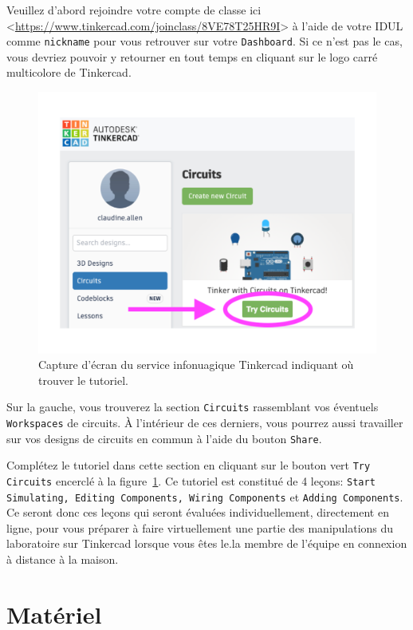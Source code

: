 \documentclass[canadien,12pt,oneside,letterpaper]{article}
\begin{document}
%
Veuillez d'abord rejoindre votre compte de classe ici <\url{https://www.tinkercad.com/joinclass/8VE78T25HR9I}> à l'aide de votre IDUL comme \texttt{nickname} pour vous retrouver sur votre \texttt{Dashboard}. Si ce n'est pas le cas, vous devriez pouvoir y retourner en tout temps en cliquant sur le logo carré multicolore de Tinkercad.
%
\begin{figure}[h]
    \centering
    \includegraphics[width=.5\linewidth]{Tutoriel_Circuits_TinkerCad.pdf}
    \caption{Capture d'écran du service infonuagique Tinkercad indiquant où trouver le tutoriel.}
    \label{fig:tinkercad-trycircuits}
\end{figure}
%
Sur la gauche, vous trouverez la section \texttt{Circuits} rassemblant vos éventuels \texttt{Workspaces} de circuits. À l'intérieur de ces derniers, vous pourrez aussi travailler sur vos designs de circuits en commun à l'aide du bouton \texttt{Share}.

Complétez le tutoriel dans cette section en cliquant sur le bouton vert \texttt{Try Circuits} encerclé à la figure~\ref{fig:tinkercad-trycircuits}. Ce tutoriel est constitué de 4 leçons: \texttt{Start Simulating, Editing Components, Wiring Components} et \texttt{Adding Components}. Ce seront donc ces leçons qui seront évaluées individuellement, directement en ligne, pour vous préparer à faire virtuellement une partie des manipulations du laboratoire sur Tinkercad lorsque vous êtes le.la membre de l'équipe en connexion à distance à la maison.

\section{Matériel}
\end{document}
